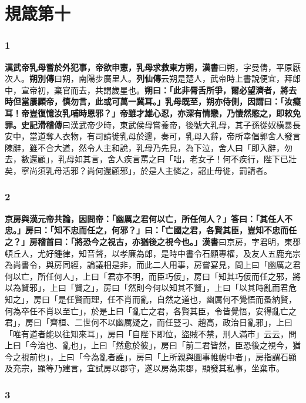\chapter{規箴第十}

\subsection*{1}

\textbf{漢武帝乳母嘗於外犯事，帝欲申憲，乳母求救東方朔，}{\footnotesize \textbf{漢書}曰朔，字曼倩，平原厭次人。\textbf{朔別傳}曰朔，南陽步廣里人。\textbf{列仙傳}云朔是楚人，武帝時上書說便宜，拜郎中，宣帝初，棄官而去，共謂歲星也。}\textbf{朔曰：「此非脣舌所爭，爾必望濟者，將去時但當屢顧帝，慎勿言，此或可萬一冀耳。」乳母既至，朔亦侍側，因謂曰：「汝癡耳！帝豈復憶汝乳哺時恩邪？」帝雖才雄心忍，亦深有情戀，乃悽然愍之，即敕免罪。}{\footnotesize \textbf{史記滑稽傳}曰漢武帝少時，東武侯母嘗養帝，後號大乳母，其子孫從奴橫暴長安中，當道奪人衣物，有司請徙乳母於邊，奏可，乳母入辭，帝所幸倡郭舍人發言陳辭，雖不合大道，然令人主和說，乳母乃先見，為下泣，舍人曰「即入辭，勿去，數還顧」，乳母如其言，舍人疾言罵之曰「咄，老女子！何不疾行，陛下已壯矣，寧尚須乳母活邪？尚何還顧邪」，於是人主憐之，詔止毋徙，罰請者。}

\subsection*{2}

\textbf{京房與漢元帝共論，因問帝：「幽厲之君何以亡，所任何人？」答曰：「其任人不忠。」房曰：「知不忠而任之，何邪？」曰：「亡國之君，各賢其臣，豈知不忠而任之？」房稽首曰：「將恐今之視古，亦猶後之視今也。」}{\footnotesize \textbf{漢書}曰京房，字君明，東郡頓丘人，尤好鍾律，知音聲，以孝廉為郎，是時中書令石顯專權，及友人五鹿充宗為尚書令，與房同經，論議相是非，而此二人用事，房嘗宴見，問上曰「幽厲之君何以亡，所任何人」，上曰「君亦不明，而臣巧佞」，房曰「知其巧佞而任之邪，將以為賢邪」，上曰「賢之」，房曰「然則今何以知其不賢」，上曰「以其時亂而君危知之」，房曰「是任賢而理，任不肖而亂，自然之道也，幽厲何不覺悟而蚤納賢，何為卒任不肖以至亡」，於是上曰「亂亡之君，各賢其臣，令皆覺悟，安得亂亡之君」，房曰「齊桓、二世何不以幽厲疑之，而任豎刁、趙高，政治日亂邪」，上曰「唯有道者能以往知來耳」，房曰「自陛下即位，盜賊不禁，刑人滿市」云云，問上曰「今治也、亂也」，上曰「然愈於彼」，房曰「前二君皆然，臣恐後之視今，猶今之視前也」，上曰「今為亂者誰」，房曰「上所親與圖事帷幄中者」，房指謂石顯及充宗，顯等乃建言，宜試房以郡守，遂以房為東郡，顯發其私事，坐棄市。}

\subsection*{3}

